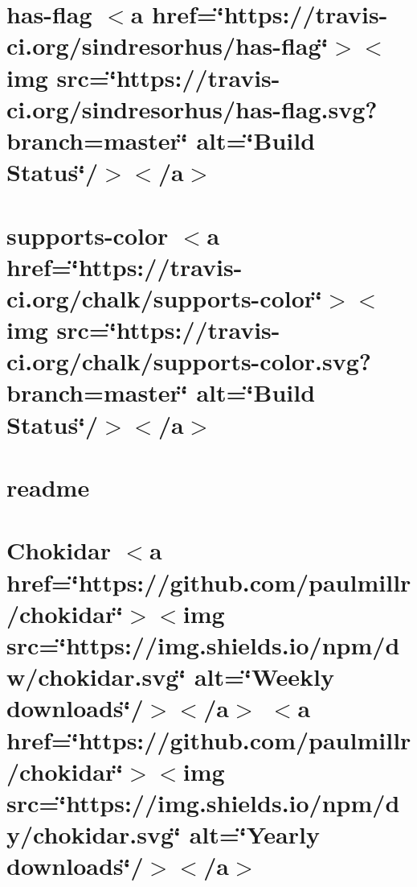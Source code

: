 \let\mypdfximage\pdfximage\def\pdfximage{\immediate\mypdfximage}\documentclass[twoside]{book}
\newcommand{\+}{\discretionary{\mbox{\scriptsize$\hookleftarrow$}}{}{}}
\begin{document}
\chapter{has-\/flag $<$a href=\char`\"{}https\+://travis-\/ci.\+org/sindresorhus/has-\/flag\char`\"{}$>$$<$img src=\char`\"{}https\+://travis-\/ci.\+org/sindresorhus/has-\/flag.\+svg?branch=master\char`\"{} alt=\char`\"{}\+Build Status\char`\"{}/$>$$<$/a$>$}
\label{md__c_1__git_hub__p_r_o_y_e_c_t_o-_i_i_i-_g_o_t_rest-api-node-mysql_node_modules_chalk_node_modules_has-flag_readme}

\chapter{supports-\/color $<$a href=\char`\"{}https\+://travis-\/ci.\+org/chalk/supports-\/color\char`\"{}$>$$<$img src=\char`\"{}https\+://travis-\/ci.\+org/chalk/supports-\/color.\+svg?branch=master\char`\"{} alt=\char`\"{}\+Build Status\char`\"{}/$>$$<$/a$>$}
\label{md__c_1__git_hub__p_r_o_y_e_c_t_o-_i_i_i-_g_o_t_rest-api-node-mysql_node_modules_chalk_node_modules_supports-color_readme}

\chapter{readme}
\label{md__c_1__git_hub__p_r_o_y_e_c_t_o-_i_i_i-_g_o_t_rest-api-node-mysql_node_modules_chalk_readme}

\chapter{Chokidar $<$a href=\char`\"{}https\+://github.\+com/paulmillr/chokidar\char`\"{}$>$$<$img src=\char`\"{}https\+://img.\+shields.\+io/npm/dw/chokidar.\+svg\char`\"{} alt=\char`\"{}\+Weekly downloads\char`\"{}/$>$$<$/a$>$ $<$a href=\char`\"{}https\+://github.\+com/paulmillr/chokidar\char`\"{}$>$$<$img src=\char`\"{}https\+://img.\+shields.\+io/npm/dy/chokidar.\+svg\char`\"{} alt=\char`\"{}\+Yearly downloads\char`\"{}/$>$$<$/a$>$}
\label{md__c_1__git_hub__p_r_o_y_e_c_t_o-_i_i_i-_g_o_t_rest-api-node-mysql_node_modules_chokidar__r_e_a_d_m_e}

\end{document}
